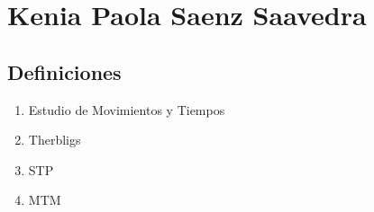 \section{Kenia Paola Saenz Saavedra}
\subsection{Definiciones}

\begin{enumerate}
    \item Estudio de Movimientos y Tiempos
    \item Therbligs
    \item STP
    \item MTM
\end{enumerate}